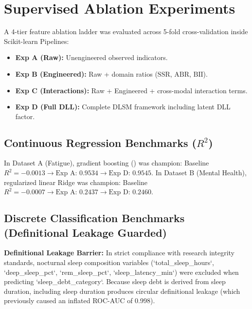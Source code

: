 \documentclass[10pt,twocolumn,a4paper]{article}
\begin{document}
\section{Supervised Ablation Experiments}
A 4-tier feature ablation ladder was evaluated across 5-fold cross-validation inside Scikit-learn Pipelines:
\begin{itemize}
    \item \textbf{Exp A (Raw):} Unengineered observed indicators.
    \item \textbf{Exp B (Engineered):} Raw + domain ratios ($\text{SSR}$, $\text{ABR}$, $\text{BII}$).
    \item \textbf{Exp C (Interactions):} Raw + Engineered + cross-modal interaction terms.
    \item \textbf{Exp D (Full DLL):} Complete DLSM framework including latent DLL factor.
\end{itemize}

\subsection{Continuous Regression Benchmarks ($R^2$)}
In Dataset A (Fatigue), gradient boosting (\citeauthor{chen2016xgboost}) was champion: Baseline $R^2 = -0.0013 \rightarrow \text{Exp A: } 0.9534 \rightarrow \text{Exp D: } \mathbf{0.9545}$.
In Dataset B (Mental Health), regularized linear Ridge was champion: Baseline $R^2 = -0.0007 \rightarrow \text{Exp A: } 0.2437 \rightarrow \text{Exp D: } \mathbf{0.2460}$.

\subsection{Discrete Classification Benchmarks (Definitional Leakage Guarded)}
\begin{tcolorbox}
\textbf{Definitional Leakage Barrier:} In strict compliance with research integrity standards, nocturnal sleep composition variables (`total\_sleep\_hours`, `deep\_sleep\_pct`, `rem\_sleep\_pct`, `sleep\_latency\_min`) were excluded when predicting `sleep\_debt\_category`. Because sleep debt is derived from sleep duration, including sleep duration produces circular definitional leakage (which previously caused an inflated ROC-AUC of 0.998).
\end{tcolorbox}
\end{document}
